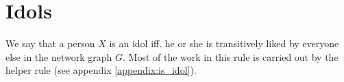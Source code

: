 %
%

\section{Idols}
We say that a person $X$ is an idol iff. he or she is transitively liked by
everyone else in the network graph $G$. Most of the work in this rule is
carried out by the helper rule  (see appendix
\ref{appendix:is_idol}).

